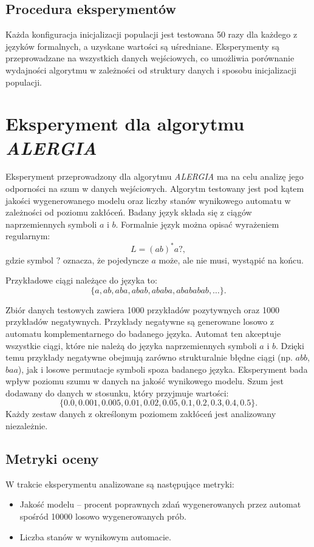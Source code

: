 \subsection{Procedura eksperymentów}  
Każda konfiguracja inicjalizacji populacji jest testowana 50 razy dla każdego z języków formalnych, a uzyskane wartości są uśredniane. Eksperymenty są przeprowadzane na wszystkich danych wejściowych, co umożliwia porównanie wydajności algorytmu w zależności od struktury danych i sposobu inicjalizacji populacji.  


\section{Eksperyment dla algorytmu \textit{ALERGIA}}  
Eksperyment przeprowadzony dla algorytmu \textit{ALERGIA} ma na celu analizę jego odporności na szum w danych wejściowych. Algorytm testowany jest pod kątem jakości wygenerowanego modelu oraz liczby stanów wynikowego automatu w zależności od poziomu zakłóceń. Badany język składa się z ciągów naprzemiennych symboli \( a \) i \( b \). Formalnie język można opisać wyrażeniem regularnym:  
\[
L = (ab)^* a?,
\]  
gdzie symbol \( ? \) oznacza, że pojedyncze \( a \) może, ale nie musi, wystąpić na końcu.  

Przykładowe ciągi należące do języka to:  
\[
\{a, ab, aba, abab, ababa, abababab, \ldots\}.
\]  

Zbiór danych testowych zawiera 1000 przykładów pozytywnych oraz 1000 przykładów negatywnych. Przykłady negatywne są generowane losowo z automatu komplementarnego do badanego języka. Automat ten akceptuje wszystkie ciągi, które nie należą do języka naprzemiennych symboli \( a \) i \( b \). Dzięki temu przykłady negatywne obejmują zarówno strukturalnie błędne ciągi (np. \( abb \), \( baa \)), jak i losowe permutacje symboli spoza badanego języka. Eksperyment bada wpływ poziomu szumu w danych na jakość wynikowego modelu. Szum jest dodawany do danych w stosunku, który przyjmuje wartości:  
\[
\{\num{0.0}, \num{0.001}, \num{0.005}, \num{0.01}, \num{0.02}, \num{0.05}, \num{0.1}, \num{0.2}, \num{0.3}, \num{0.4}, \num{0.5}\}.
\]  
Każdy zestaw danych z określonym poziomem zakłóceń jest analizowany niezależnie.  

\subsection{Metryki oceny}  
W trakcie eksperymentu analizowane są następujące metryki:  
\begin{itemize}  
    \item Jakość modelu – procent poprawnych zdań wygenerowanych przez automat spośród \num{10000} losowo wygenerowanych prób.  
    \item Liczba stanów w wynikowym automacie.  
\end{itemize}  

